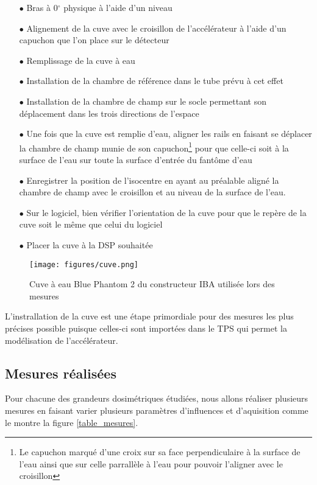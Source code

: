 \documentclass{book}
\begin{document}
\begin{itemize}
  \item[$\bullet$] Bras à 0$^{\circ}$ physique à l'aide d'un niveau 
  \item[$\bullet$] Alignement de la cuve avec le croisillon de l'accélérateur à l'aide d'un capuchon que l'on place sur le détecteur
  \item[$\bullet$] Remplissage de la cuve à eau
  \item[$\bullet$] Installation de la chambre de référence dans le tube prévu à cet effet
  \item[$\bullet$] Installation de la chambre de champ sur le socle permettant son déplacement dans les trois directions de l'espace
  \item[$\bullet$] Une fois que la cuve est remplie d'eau, aligner les rails en faisant se déplacer la chambre de champ munie de son capuchon\footnote{Le capuchon marqué d'une croix sur sa face perpendiculaire à la surface de l'eau ainsi que sur celle parrallèle à l'eau pour pouvoir l'aligner avec le croisillon} pour que celle-ci soit à la surface de l'eau sur toute la surface d'entrée du fantôme d'eau
  \item[$\bullet$] Enregistrer la position de l'isocentre en ayant au préalable aligné la chambre de champ avec le croisillon et au niveau de la surface de l'eau. 
  \item[$\bullet$] Sur le logiciel, bien vérifier l'orientation de la cuve pour que le repère de la cuve soit le même que celui du logiciel
  \item[$\bullet$] Placer la cuve à la DSP souhaitée
\end{itemize}

\begin{figure}[h]
  \centering
  \texttt{[image: figures/cuve.png]}
  \caption{Cuve à eau Blue Phantom 2 du constructeur IBA utilisée lors des mesures}
  \label{fig_cuve}
\end{figure}

L'instrallation de la cuve est une étape primordiale pour des mesures les plus précises possible puisque celles-ci sont importées dans le TPS qui permet la modélisation de l'accélérateur.

\newpage
\subsection{Mesures réalisées}

Pour chacune des grandeurs dosimétriques étudiées, nous allons réaliser plusieurs mesures en faisant varier plusieurs paramètres d'influences et d'aquisition comme le montre la figure \ref*{table_mesures}.
\end{document}
